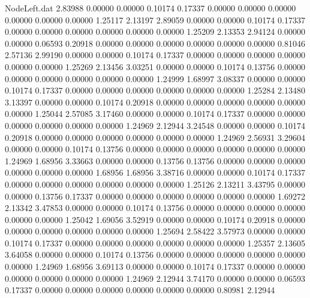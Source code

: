 \begin{filecontents}{NodeLeft.dat}
   2.83988    0.00000    0.00000     0.10174    0.17337    0.00000    0.00000    0.00000    0.00000    0.00000    0.00000    1.25117    2.13197
   2.89059    0.00000    0.00000     0.10174    0.17337    0.00000    0.00000    0.00000    0.00000    0.00000    0.00000    1.25209    2.13353
   2.94124    0.00000    0.00000     0.06593    0.20918    0.00000    0.00000    0.00000    0.00000    0.00000    0.00000    0.81046    2.57136
   2.99190    0.00000    0.00000     0.10174    0.17337    0.00000    0.00000    0.00000    0.00000    0.00000    0.00000    1.25269    2.13456
   3.03251    0.00000    0.00000     0.10174    0.13756    0.00000    0.00000    0.00000    0.00000    0.00000    0.00000    1.24999    1.68997
   3.08337    0.00000    0.00000     0.10174    0.17337    0.00000    0.00000    0.00000    0.00000    0.00000    0.00000    1.25284    2.13480
   3.13397    0.00000    0.00000     0.10174    0.20918    0.00000    0.00000    0.00000    0.00000    0.00000    0.00000    1.25044    2.57085
   3.17460    0.00000    0.00000     0.10174    0.17337    0.00000    0.00000    0.00000    0.00000    0.00000    0.00000    1.24969    2.12944
   3.24548    0.00000    0.00000     0.10174    0.20918    0.00000    0.00000    0.00000    0.00000    0.00000    0.00000    1.24969    2.56931
   3.29604    0.00000    0.00000     0.10174    0.13756    0.00000    0.00000    0.00000    0.00000    0.00000    0.00000    1.24969    1.68956
   3.33663    0.00000    0.00000     0.13756    0.13756    0.00000    0.00000    0.00000    0.00000    0.00000    0.00000    1.68956    1.68956
   3.38716    0.00000    0.00000     0.10174    0.17337    0.00000    0.00000    0.00000    0.00000    0.00000    0.00000    1.25126    2.13211
   3.43795    0.00000    0.00000     0.13756    0.17337    0.00000    0.00000    0.00000    0.00000    0.00000    0.00000    1.69272    2.13342
   3.47853    0.00000    0.00000     0.10174    0.13756    0.00000    0.00000    0.00000    0.00000    0.00000    0.00000    1.25042    1.69056
   3.52919    0.00000    0.00000     0.10174    0.20918    0.00000    0.00000    0.00000    0.00000    0.00000    0.00000    1.25694    2.58422
   3.57973    0.00000    0.00000     0.10174    0.17337    0.00000    0.00000    0.00000    0.00000    0.00000    0.00000    1.25357    2.13605
   3.64058    0.00000    0.00000     0.10174    0.13756    0.00000    0.00000    0.00000    0.00000    0.00000    0.00000    1.24969    1.68956
   3.69113    0.00000    0.00000     0.10174    0.17337    0.00000    0.00000    0.00000    0.00000    0.00000    0.00000    1.24969    2.12944
   3.74170    0.00000    0.00000     0.06593    0.17337    0.00000    0.00000    0.00000    0.00000    0.00000    0.00000    0.80981    2.12944

\end{filecontents}
